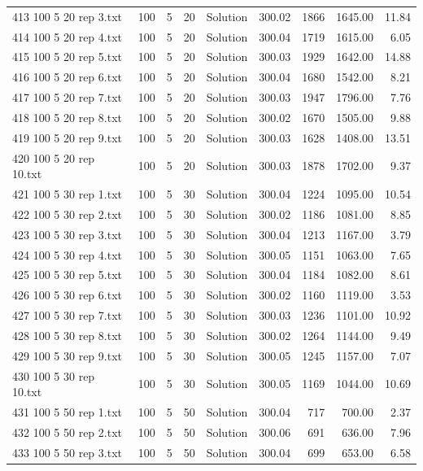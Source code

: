\begin{longtable}{lrrllrrrr}
413 100 5 20 rep 3.txt & 100 & 5 & 20 & Solution & 300.02 & 1866 & 1645.00 & 11.84\\
414 100 5 20 rep 4.txt & 100 & 5 & 20 & Solution & 300.04 & 1719 & 1615.00 &  6.05\\
415 100 5 20 rep 5.txt & 100 & 5 & 20 & Solution & 300.03 & 1929 & 1642.00 & 14.88\\
416 100 5 20 rep 6.txt & 100 & 5 & 20 & Solution & 300.04 & 1680 & 1542.00 &  8.21\\
417 100 5 20 rep 7.txt & 100 & 5 & 20 & Solution & 300.03 & 1947 & 1796.00 &  7.76\\
418 100 5 20 rep 8.txt & 100 & 5 & 20 & Solution & 300.02 & 1670 & 1505.00 &  9.88\\
419 100 5 20 rep 9.txt & 100 & 5 & 20 & Solution & 300.03 & 1628 & 1408.00 & 13.51\\
420 100 5 20 rep 10.txt & 100 & 5 & 20 & Solution & 300.03 & 1878 & 1702.00 &  9.37\\
421 100 5 30 rep 1.txt & 100 & 5 & 30 & Solution & 300.04 & 1224 & 1095.00 & 10.54\\
422 100 5 30 rep 2.txt & 100 & 5 & 30 & Solution & 300.02 & 1186 & 1081.00 &  8.85\\
423 100 5 30 rep 3.txt & 100 & 5 & 30 & Solution & 300.04 & 1213 & 1167.00 &  3.79\\
424 100 5 30 rep 4.txt & 100 & 5 & 30 & Solution & 300.05 & 1151 & 1063.00 &  7.65\\
425 100 5 30 rep 5.txt & 100 & 5 & 30 & Solution & 300.04 & 1184 & 1082.00 &  8.61\\
426 100 5 30 rep 6.txt & 100 & 5 & 30 & Solution & 300.02 & 1160 & 1119.00 &  3.53\\
427 100 5 30 rep 7.txt & 100 & 5 & 30 & Solution & 300.03 & 1236 & 1101.00 & 10.92\\
428 100 5 30 rep 8.txt & 100 & 5 & 30 & Solution & 300.02 & 1264 & 1144.00 &  9.49\\
429 100 5 30 rep 9.txt & 100 & 5 & 30 & Solution & 300.05 & 1245 & 1157.00 &  7.07\\
430 100 5 30 rep 10.txt & 100 & 5 & 30 & Solution & 300.05 & 1169 & 1044.00 & 10.69\\
431 100 5 50 rep 1.txt & 100 & 5 & 50 & Solution & 300.04 & 717 & 700.00 &  2.37\\
432 100 5 50 rep 2.txt & 100 & 5 & 50 & Solution & 300.06 & 691 & 636.00 &  7.96\\
433 100 5 50 rep 3.txt & 100 & 5 & 50 & Solution & 300.04 & 699 & 653.00 &  6.58\\

\end{longtable}
